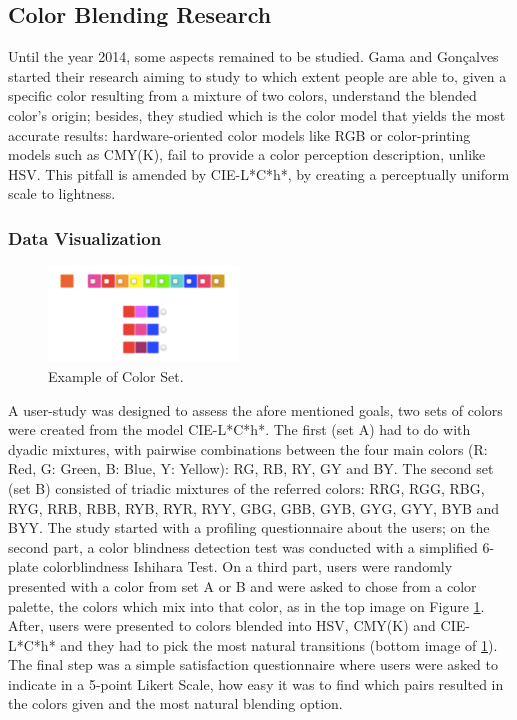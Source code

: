 \documentclass{report}
\begin{document}
\subsection{Color Blending Research}
Until the year 2014, some aspects remained to be studied. Gama and Gonçalves started their research \cite{Gama20141}
aiming to study to which extent people are able to, given a specific color resulting from a mixture of
two colors, understand the blended color’s origin; besides, they studied which is the color model that
yields the most accurate results: hardware-oriented color models like RGB or color-printing models such
as CMY(K), fail to provide a color perception description, unlike HSV. This pitfall is amended by CIE-L*C*h*,
by creating a perceptually uniform scale to lightness.  \par
%
\subsubsection{Data Visualization} 
%
\begin{figure}
	\centering
    \vspace{-\baselineskip}
    \includegraphics[width=0.45\textwidth]{TestDataVis.png}
    \caption[Color Blending for Data Visualization]{Example of Color Set. \protect\cite{Gama20141}}
    \label{fig:datavis}
\end{figure}
%
A user-study was designed \cite{Gama20141} to assess the afore mentioned goals, two sets of colors were created from the model CIE-L*C*h*. The first (set A) had
to do with dyadic mixtures, with pairwise combinations between the four main colors (R: Red, G: Green, B: Blue,
Y: Yellow): RG, RB, RY, GY and BY. The second set (set B) consisted of triadic mixtures of the referred colors:
RRG, RGG, RBG, RYG, RRB, RBB, RYB, RYR, RYY, GBG, GBB, GYB, GYG, GYY, BYB and BYY. The study started with a
profiling questionnaire about the users; on the second part, a color blindness detection test was conducted
with a simplified 6-plate colorblindness Ishihara Test. On a third part, users were randomly
presented with a color from set A or B and were asked to chose from a color palette, the colors which mix
into that color, as in the top image on Figure \ref{fig:datavis}. After, users were presented to colors blended 
into HSV, CMY(K) and CIE-L*C*h* and they had to pick the most natural transitions (bottom image of \ref{fig:datavis}).
The final step was a simple satisfaction questionnaire where users were asked to indicate in a 5-point Likert Scale,
how easy it was to find which pairs resulted in the colors given and the most natural blending option. \par
\end{document}
